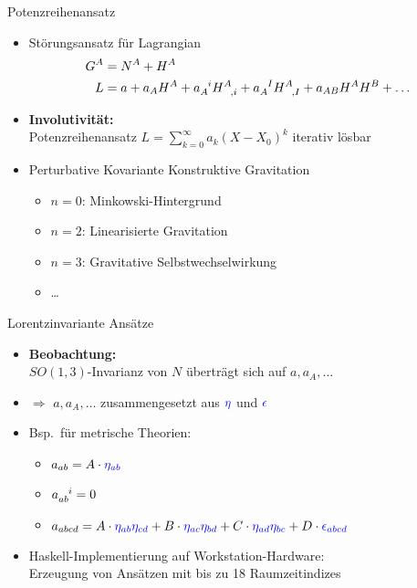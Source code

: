 \documentclass{beamer}
\begin{document}
    \begin{frame}{Potenzreihenansatz}
        \begin{itemize}
            \item Störungsansatz für Lagrangian
            \setlength{\belowdisplayskip}{-10pt}
            \begin{align*}
                G^A &= N^A + H^A \\
                L &= a + a_A H^A + a_A^{\hphantom Ai} H^A_{\hphantom{A},i} + a_A^{\hphantom AI} H^A_{\hphantom{A},I} + a_{AB} H^A H^B + \ldots
            \end{align*}
            \item \textbf{Involutivität:} \\
            Potenzreihenansatz $ L = \sum_{k=0}^\infty a_k (X-X_0)^k $ iterativ lösbar
            \item Perturbative Kovariante Konstruktive Gravitation
            \begin{itemize}
                \item $n=0$: Minkowski-Hintergrund
                \item $n=2$: Linearisierte Gravitation
                \item $n=3$: Gravitative Selbstwechselwirkung
                \item \ldots
            \end{itemize}
        \end{itemize}
    \end{frame}

    \begin{frame}{Lorentzinvariante Ansätze}
        \begin{itemize}
            \item \textbf{Beobachtung:} \\ $SO(1,3)$-Invarianz von $N$ überträgt sich auf $a, a_A, \ldots$
            \item $\Rightarrow$ $a, a_A, \ldots$ zusammengesetzt aus ${\color{blue}\eta}$ und ${\color{blue}\epsilon}$
            \item Bsp.\ für metrische Theorien:
            \begin{itemize}
                \item $a_{ab} = A \cdot {\color{blue}\eta_{ab}}$
                \item $a_{ab}^{\hphantom{ab}i} = 0$
                \item $a_{abcd} = A\cdot {\color{blue}\eta_{ab} \eta_{cd}} + B\cdot {\color{blue}\eta_{ac} \eta_{bd}} + C\cdot {\color{blue}\eta_{ad} \eta_{bc}} + D \cdot {\color{blue}\epsilon_{abcd}}$
            \end{itemize}
            \item Haskell-Implementierung auf Workstation-Hardware: \\
            Erzeugung von Ansätzen mit bis zu 18 Raumzeitindizes
        \end{itemize}
    \end{frame}
\end{document}

